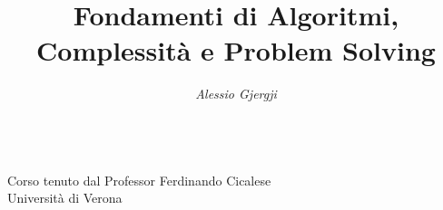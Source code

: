 \documentclass[oneside,a4paper,11pt]{book}
\title{Fondamenti di Algoritmi, Complessità e Problem Solving}
\author{\textit{Alessio Gjergji}}
\date{}
\theoremstyle{italicstyle}
\theoremstyle{normStyle}
\begin{document}
\begin{titlingpage}
  \centering
  \huge
  \textbf{\thetitle}\\[0.5cm]
  \normalsize
  Corso tenuto dal Professor Ferdinando Cicalese\\[0.5cm]
  Università di Verona\\[1cm]
  \large
  \theauthor\\[0.5cm]
\end{titlingpage}
\tableofcontents


\end{document}
